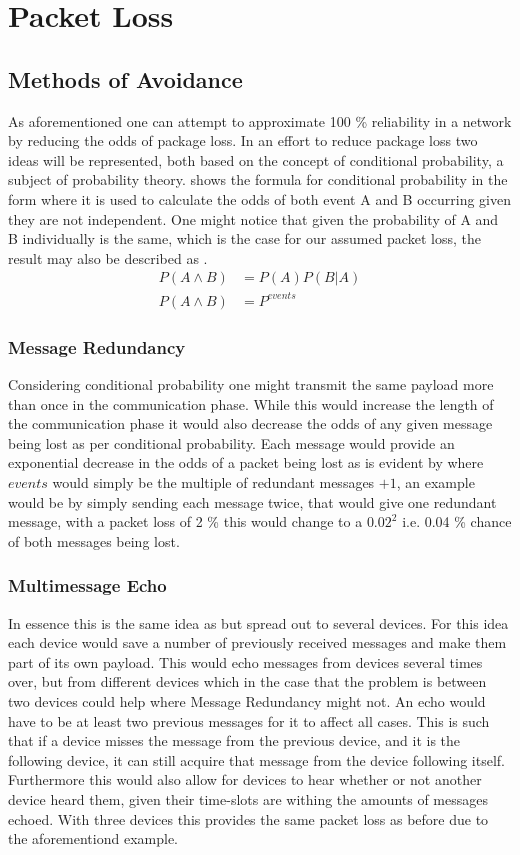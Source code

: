 \section{Packet Loss}
\subsection{Methods of Avoidance}
As aforementioned one can attempt to approximate 100 \% reliability in a network by reducing the odds of package loss.
In an effort to reduce package loss two ideas will be represented, both based on the concept of conditional probability, a subject of probability theory.
 shows the formula for conditional probability in the form where it is used to calculate the odds of both event A and B occurring given they are not independent.
One might notice that given the probability of A and B individually is the same, which is the case for our assumed packet loss, the result may also be described as .
\begin{align}
P(A \land B) &= P(A)P(B|A) \label{eq:conditionalProb} \\  
P(A \land B) &= P^{events} \label{eq:conditionalProb2}
\end{align}

\subsubsection*{Message Redundancy}\label{redundancy}
Considering conditional probability one might transmit the same payload more than once in the communication phase.
While this would increase the length of the communication phase it would also decrease the odds of any given message being lost as per conditional probability.
Each message would provide an exponential decrease in the odds of a packet being lost as is evident by  where $events$ would simply be the multiple of redundant messages $+ 1$, an example would be by simply sending each message twice, that would give one redundant message, with a packet loss of 2 \% this would change to a $0.02^2$ i.e. 0.04 \% chance of both messages being lost.

\subsubsection*{Multimessage Echo}
In essence this is the same idea as  but spread out to several devices.
For this idea each device would save a number of previously received messages and make them part of its own payload.
This would echo messages from devices several times over, but from different devices which in the case that the problem is between two devices could help where Message Redundancy might not.
An echo would have to be at least two previous messages for it to affect all cases.
This is such that if a device misses the message from the previous device, and it is the following device, it can still acquire that message from the device following itself.
Furthermore this would also allow for devices to hear whether or not another device heard them, given their time-slots are withing the amounts of messages echoed.
With three devices this provides the same packet loss as before due to the aforementiond example.